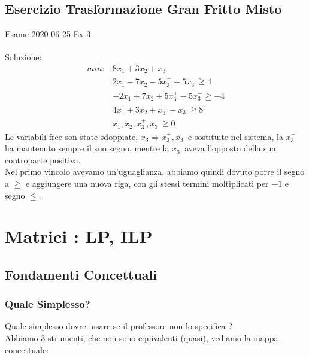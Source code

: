 \documentclass{article}
\begin{document}
\subsection{Esercizio Trasformazione Gran Fritto Misto}
Esame 2020-06-25 Ex 3\\
\noindent{}%
\\
Soluzione:\\
\begin{align*}
min:  &8x_1 + 3x_2 + x_3 \\
    	&2x_1 - 7x_2 - 5x_3^+ + 5x_3^- \geqq 4\\
    	&-2x_1 + 7x_2 + 5x_3^+ - 5x_3^- \geqq -4\\
    	&4x_1 + 3x_2 + x_3^+ -x_3^- \geqq 8\\
    	&x_1,x_2,x_3^+,x_3^- \geqq 0
\end{align*}
Le variabili free son state sdoppiate, $x_3 \Rightarrow x_3^+,x_3^-$ e sostituite nel sistema, la $x_3^+$ ha mantenuto sempre il suo segno, mentre la $x_3^-$ aveva l'opposto della sua controparte positiva.\\
Nel primo vincolo avevamo un'uguaglianza, abbiamo quindi dovuto porre il segno a $\geqq$ e aggiungere una nuova riga, con gli stessi termini moltiplicati per $-1$ e segno $\leqq$.

\newpage
\section{Matrici : LP, ILP}

\subsection{Fondamenti Concettuali}
\subsubsection{Quale Simplesso?}
Quale simplesso dovrei usare se il professore non lo specifica ?\\
Abbiamo 3 strumenti, che non sono equivalenti (quasi), vediamo la mappa concettuale:\\
\end{document}
